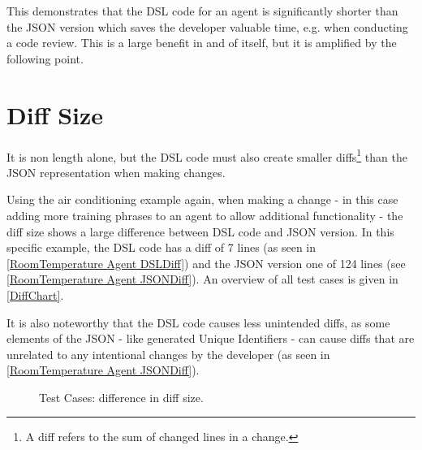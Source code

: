 This demonstrates that the DSL code for an agent is significantly shorter than the JSON version which saves the developer valuable time, e.g. when conducting a code review. This is a large benefit in and of itself, but it is amplified by the following point.


\section{Diff Size}
It is non length alone, but the DSL code must also create smaller diffs\footnote{A diff refers to the sum of changed lines in a change.} than the JSON representation when making changes.

Using the air conditioning example again, when making a change - in this case adding more training phrases to an agent to allow additional functionality - the diff size shows a large difference between DSL code and JSON version. In this specific example, the DSL code has a diff of 7 lines (as seen in \autoref{RoomTemperature Agent DSLDiff}) and the JSON version one of 124 lines (see \autoref{RoomTemperature Agent JSONDiff}).
An overview of all test cases is given in \autoref{DiffChart}.

It is also noteworthy that the DSL code causes less unintended diffs, as some elements of the JSON - like generated Unique Identifiers - can cause diffs that are unrelated to any intentional changes by the developer (as seen in \autoref{RoomTemperature Agent JSONDiff}).

\begin{figure}
    \centering
    \caption{Test Cases: difference in diff size.}
    
    \label{DiffChart}
    
\end{figure}

